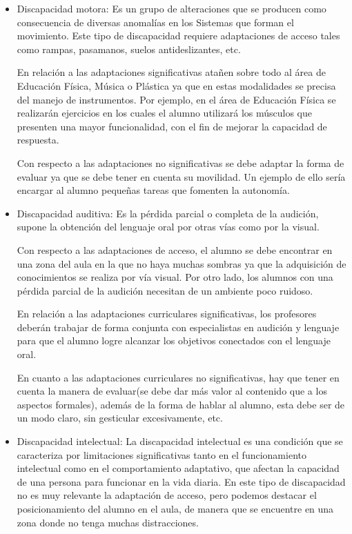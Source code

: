 \begin{itemize}
    \item Discapacidad motora: Es un grupo de alteraciones que se producen como consecuencia de diversas anomalías en los Sistemas que forman el movimiento. Este tipo de discapacidad requiere  adaptaciones de acceso tales como rampas, pasamanos, suelos antideslizantes, etc.

          En relación a las adaptaciones significativas atañen sobre todo al área de Educación Física, Música o Plástica ya que en estas modalidades se precisa del manejo de instrumentos. Por ejemplo, en el área de Educación Física se realizarán ejercicios en los cuales el alumno utilizará los músculos que presenten una mayor funcionalidad, con el fin de mejorar la capacidad de respuesta.

          Con respecto a las adaptaciones no significativas se debe adaptar la forma de evaluar ya que se debe tener en cuenta su movilidad. Un ejemplo de ello sería encargar al alumno pequeñas tareas que fomenten la autonomía.

    \item Discapacidad auditiva: Es la pérdida parcial o completa de la audición, supone la obtención del lenguaje oral por otras vías como por la visual.

          Con respecto a las adaptaciones de acceso, el alumno se debe encontrar en una zona del aula en la que no haya muchas sombras ya que la adquisición de conocimientos se realiza por vía visual. Por otro lado, los alumnos con una pérdida parcial de la audición necesitan de un ambiente poco ruidoso.

          En relación a las adaptaciones curriculares significativas, los profesores deberán trabajar de forma conjunta con especialistas en audición y lenguaje para que el alumno logre alcanzar los objetivos conectados con el lenguaje oral.

          En cuanto a las adaptaciones curriculares no significativas, hay que tener en cuenta la manera de evaluar(se debe dar más valor al contenido que a los aspectos formales), además de la forma de hablar al alumno, esta debe ser de un modo claro, sin gesticular excesivamente, etc.

    \item Discapacidad intelectual: La discapacidad intelectual es una condición que se caracteriza por limitaciones significativas tanto en el funcionamiento intelectual como en el comportamiento adaptativo, que afectan la capacidad de una persona para funcionar en la vida diaria. En este tipo de discapacidad no es muy relevante la adaptación de acceso, pero podemos destacar el posicionamiento del alumno en el aula, de manera que se encuentre en una zona donde no tenga muchas distracciones.


\end{itemize}
